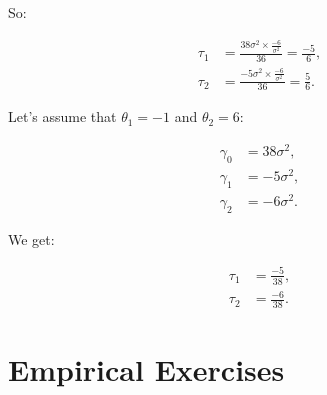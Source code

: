 \documentclass[
  a4paper]{article}
\begin{document}
So:

\begin{align*}
\tau_1 & = \frac{38 \sigma^2 \times \frac{-6}{\sigma^2} }{36} = \frac{-5}{6}, \\
\tau_2 & = \frac{-5 \sigma^2 \times \frac{-6}{\sigma^2}}{36} = \frac{5}{6}.
\end{align*}

Let's assume that \(\theta_1 = -1\) and \(\theta_2 = 6\):

\begin{align*}
\gamma_0 & = 38 \sigma^2, \\
\gamma_1 & = -5 \sigma^2, \\
\gamma_2 & = -6 \sigma^2.
\end{align*}

We get:

\begin{align*}
\tau_1 & = \frac{-5}{38}, \\
\tau_2 & = \frac{-6}{38}.
\end{align*}

\hypertarget{empirical-exercises}{%
\section{Empirical Exercises}\label{empirical-exercises}}
\end{document}
